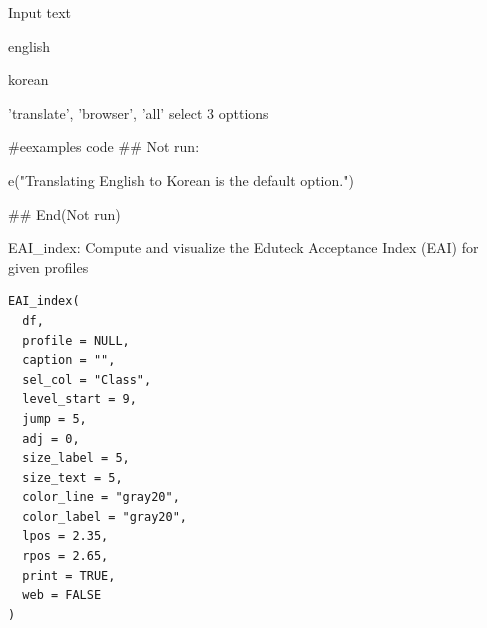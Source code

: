 \documentclass[a4paper]{book}
\begin{document}
%
\begin{Arguments}
\begin{ldescription}
\item[\code{text}] Input text

\item[\code{slang}] english

\item[\code{elang}] korean

\item[\code{show}] 'translate', 'browser', 'all' select 3 opttions
\end{ldescription}
\end{Arguments}
%
\begin{Examples}
\begin{ExampleCode}
#eexamples code
\#\# Not run: 

e("Translating English to Korean is the default option.")

## End(Not run)



\end{ExampleCode}
\end{Examples}
%
\begin{Description}
EAI\_index: Compute and visualize the Eduteck Acceptance Index (EAI) for given profiles
\end{Description}
%
\begin{Usage}
\begin{verbatim}
EAI_index(
  df,
  profile = NULL,
  caption = "",
  sel_col = "Class",
  level_start = 9,
  jump = 5,
  adj = 0,
  size_label = 5,
  size_text = 5,
  color_line = "gray20",
  color_label = "gray20",
  lpos = 2.35,
  rpos = 2.65,
  print = TRUE,
  web = FALSE
)
\end{verbatim}
\end{Usage}
%
\end{document}
